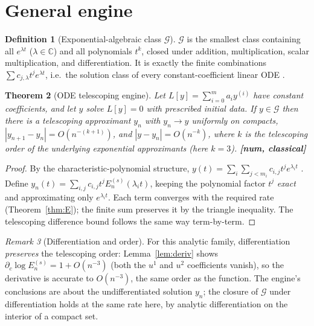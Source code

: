 \documentclass[11pt]{article}
\theoremstyle{plain}
\newtheorem{theorem}{Theorem}
\theoremstyle{definition}
\newtheorem{definition}[theorem]{Definition}
\theoremstyle{remark}
\newtheorem{remark}[theorem]{Remark}
\newcommand{\C}{\mathbb{C}}
\begin{document}
\section{General engine}

\begin{definition}[Exponential-algebraic class $\mathcal G$]\label{def:G}
$\mathcal G$ is the smallest class containing all $e^{\lambda t}$ ($\lambda\in\C$)
and all polynomials $t^k$, closed under addition, multiplication, scalar
multiplication, and differentiation. It is exactly the finite combinations
$\sum c_{j,\lambda}t^j e^{\lambda t}$, i.e.\ the solution class of every
constant-coefficient linear ODE \cite{CoddingtonLevinson}.
\end{definition}

\begin{theorem}[ODE telescoping engine]\label{thm:engine}
Let $L[y]=\sum_{i=0}^m a_iy^{(i)}$ have constant coefficients, and let $y$ solve
$L[y]=0$ with prescribed initial data. If $y\in\mathcal G$ then there is a
telescoping approximant $y_n$ with $y_n\to y$ uniformly on compacts,
$|y_{n+1}-y_n| = O(n^{-(k+1)})$, and $|y-y_n| = O(n^{-k})$, where $k$ is the
telescoping order of the underlying exponential approximants (here $k=3$).
\hfill\textbf{[num, classical]}
\end{theorem}
\begin{proof}
By the characteristic-polynomial structure,
$y(t)=\sum_{i}\sum_{j<m_i}c_{i,j}t^je^{\lambda_it}$ \cite{CoddingtonLevinson}.
Define $y_n(t)=\sum_{i,j}c_{i,j}t^jE_n^{(s)}(\lambda_it)$, keeping the
polynomial factor $t^j$ \emph{exact} and approximating only $e^{\lambda_it}$. Each
term converges with the required rate (Theorem~\ref{thm:E}); the finite sum
preserves it by the triangle inequality. The telescoping difference bound follows
the same way term-by-term.
\end{proof}

\begin{remark}[Differentiation and order]
For this analytic family, differentiation \emph{preserves} the telescoping order:
Lemma~\ref{lem:deriv} shows $\partial_c\log E_n^{(s)} = 1 + O(n^{-3})$ (both the
$u^1$ and $u^2$ coefficients vanish), so the derivative is accurate to
$O(n^{-3})$, the same order as the function. The engine's conclusions are about
the undifferentiated solution $y_n$; the closure of $\mathcal G$ under
differentiation holds at the same rate here, by analytic differentiation on the
interior of a compact set.
\end{remark}
\end{document}
